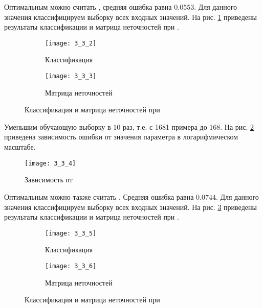 Оптимальным можно считать , средняя ошибка равна $0.0553$. Для данного значения классифицируем выборку всех входных значений. На рис. \ref{fig:3_3_2} приведены результаты классификации и матрица неточностей при .
\begin{figure}[H]
\begin{center}
	\begin{subfigure}{0.49\textwidth}
		\texttt{[image: 3\_3\_2]}
		\caption{Классификация}
	\end{subfigure}
	\begin{subfigure}{0.49\textwidth}
		\texttt{[image: 3\_3\_3]}
		\caption{Матрица неточностей}
	\end{subfigure}
	\caption{Классификация и матрица неточностей при }
	\label{fig:3_3_2}
\end{center}
\end{figure}

\newpage

Уменьшим обучающую выборку в 10 раз, т.е. с 1681 примера до 168. На рис. \ref{fig:3_3_4} приведена зависимость ошибки  от значения параметра  в логарифмическом масштабе. 
\begin{figure}[H]
\begin{center}
	\texttt{[image: 3\_3\_4]}
	\caption{Зависимость  от }
	\label{fig:3_3_4}
\end{center}
\end{figure}
\vspace{-1cm}

Оптимальным можно также считать . Средняя ошибка равна $0.0744$. Для данного значения классифицируем выборку всех входных значений. На рис. \ref{fig:3_3_5} приведены результаты классификации и матрица неточностей при .
\begin{figure}[H]
\begin{center}
	\begin{subfigure}{0.49\textwidth}
		\texttt{[image: 3\_3\_5]}
		\caption{Классификация}
	\end{subfigure}
	\begin{subfigure}{0.49\textwidth}
		\texttt{[image: 3\_3\_6]}
		\caption{Матрица неточностей}
	\end{subfigure}
	\caption{Классификация и матрица неточностей при }
	\label{fig:3_3_5}
\end{center}
\end{figure}

